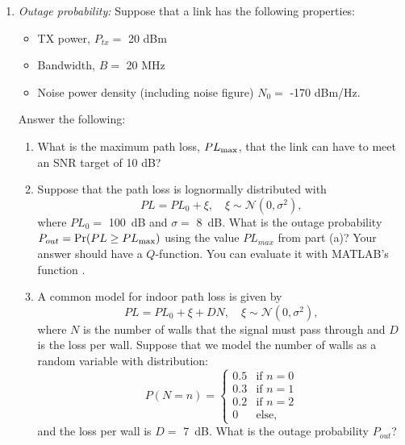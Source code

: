 \documentclass[11pt]{article}
\begin{document}
\begin{enumerate}
\item \emph{Outage probability:} Suppose that a link has the following properties:
\begin{itemize}
\item TX power, $P_{tx} =$ 20 dBm
\item Bandwidth, $B =$ 20 MHz
\item Noise power density (including noise figure) $N_0=$ -170 dBm/Hz.
\end{itemize}
Answer the following:
\begin{enumerate}[label=(\alph*)]
\item What is the maximum path loss, $PL_{\rm max}$, that the link can
have to meet an SNR target of 10 dB?
\item Suppose that the path loss is lognormally distributed with
\[
    PL = PL_0 + \xi, \quad \xi \sim {\mathcal N}(0,\sigma^2),
\]
where $PL_0 =$ \SI{100}{dB} and $\sigma =$ \SI{8}{dB}.
What is the outage probability $P_{out}=\Pr(PL \geq PL_{\rm max})$
using the value $PL_{max}$ from part (a)?
Your answer should have
a $Q$-function.  You can evaluate it with MATLAB's function .

\item A common model for indoor path loss is given by
\[
    PL = PL_0 + \xi + DN, \quad \xi \sim {\mathcal N}(0,\sigma^2),
\]
where $N$ is the number of walls that the signal must pass through
and $D$ is the loss per wall.  Suppose that we model the number of
walls as a random variable with distribution:
\[
    P(N=n) = \begin{cases}
        0.5 & \mbox{if } n=0 \\
        0.3 & \mbox{if } n=1 \\
        0.2 & \mbox{if } n=2 \\
        0 & \mbox{else, }
        \end{cases}
\]
and the loss per wall is $D=$ \SI{7}{dB}.
What is the outage probability $P_{out}$?
\end{enumerate}


\end{enumerate}
\end{document}
